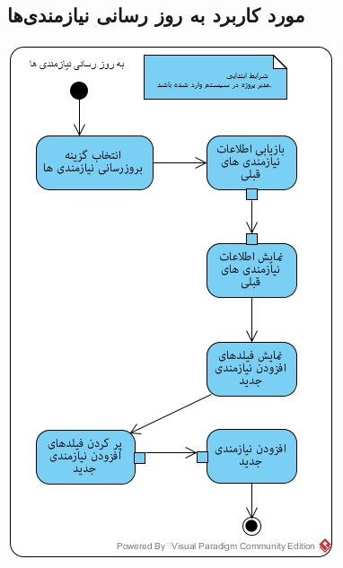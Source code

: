 \documentclass{article}
\begin{document}
\newpage
\vspace{2cm}
\subsection*{مورد کاربرد به روز رسانی نیازمندی‌ها}
\vspace{2cm}
\begin{center}
\includegraphics[width=\textwidth]{ActivityDiagrams/24.jpg}
\end{center}

\newpage
\vspace{2cm}
\end{document}
